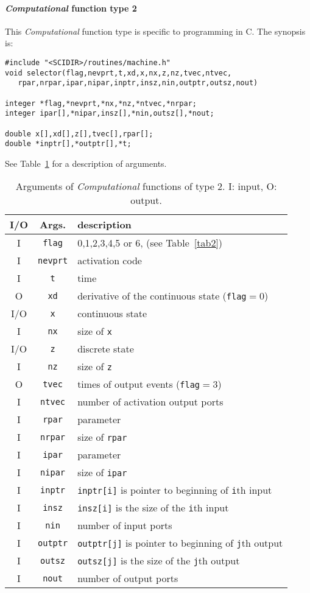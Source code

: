 \documentclass{article}
\newcommand{\computational}{{\em Computational }}
\begin{document}
\paragraph{\computational function type 2}
This \computational function type is specific to programming in C. The
synopsis is:

\begin{verbatim}
#include "<SCIDIR>/routines/machine.h"
void selector(flag,nevprt,t,xd,x,nx,z,nz,tvec,ntvec,
   rpar,nrpar,ipar,nipar,inptr,insz,nin,outptr,outsz,nout)

integer *flag,*nevprt,*nx,*nz,*ntvec,*nrpar;
integer ipar[],*nipar,insz[],*nin,outsz[],*nout;

double x[],xd[],z[],tvec[],rpar[];
double *inptr[],*outptr[],*t;
\end{verbatim}

See Table~\ref{tab20} for a description of arguments.
\begin{table}[ht]
\begin{center}
\begin{tabular}{|c|c|l|} \hline
I/O&Args.&description \\ \hline
I& {\tt  *flag}& 0,1,2,3,4,5 or 6,  (see Table~\ref{tab2})\\
I& {\tt  *nevprt}& activation code \\
I& {\tt  *t}& time\\
O& {\tt  xd}& derivative of the continuous
       state ({\tt flag}$=0$) \\
I/O& {\tt  x}& continuous state\\
I& {\tt  *nx}& size of {\tt x}\\
I/O& {\tt  z}& discrete state\\
I& {\tt  *nz}& size of {\tt z}\\
O& {\tt  tvec} & times of output events ({\tt flag}$=$3)\\
I& {\tt  *ntvec}& number of activation output ports\\
I& {\tt  rpar}& parameter\\
I& {\tt  *nrpar}& size of {\tt rpar}\\
I& {\tt  ipar}& parameter\\
I& {\tt  *nipar}& size of {\tt ipar}\\
I& {\tt  inptr}& {\tt inptr[i]} is  pointer to
         beginning of  {\tt i}th  input\\
I& {\tt  insz}& {\tt insz[i]} is the size of the
        {\tt i}th   input \\
I& {\tt  *nin}& number of  input ports\\
I& {\tt  outptr}& {\tt outptr[j]} is pointer to 
       beginning of {\tt j}th  output \\
I& {\tt  outsz}& {\tt outsz[j]} is the size of the
          {\tt j}th   output \\
I& {\tt  *nout}& number of  output ports \\ \hline
\end{tabular}
\caption{Arguments of \computational functions of type 2. I: input, O: output.}
\label{tab20}
\end{center}
\end{table}
\end{document}
